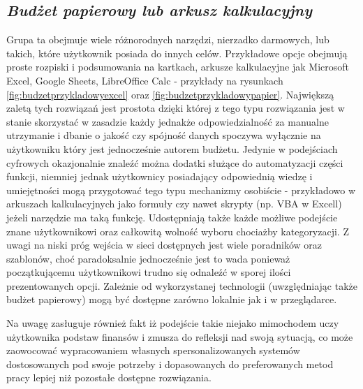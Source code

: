 \documentclass[a4paper,10pt, twoside]{report}
\newcommand{\customstylesection}[1]{\textbf{\textit{#1}}}
\begin{document}
\begin{large}
\section{\customstylesection{Budżet papierowy lub arkusz kalkulacyjny}}
{Grupa ta obejmuje wiele różnorodnych narzędzi, nierzadko darmowych, lub takich, 
które użytkownik posiada do innych celów. Przykładowe opcje obejmują proste 
rozpiski i podsumowania na kartkach, arkusze kalkulacyjne jak Microsoft 
Excel, Google Sheets, LibreOffice Calc - przykłady na rysunkach 
\ref{fig:budzetprzykladowyexcel} oraz \ref{fig:budzetprzykladowypapier}. Największą 
zaletą tych rozwiązań jest prostota dzięki której z tego typu rozwiązania jest 
w stanie skorzystać w zasadzie każdy jednakże odpowiedzialność za manualne 
utrzymanie i dbanie o jakość czy spójność danych spoczywa wyłącznie na 
użytkowniku który jest jednocześnie autorem budżetu. Jedynie w podejściach 
cyfrowych okazjonalnie znaleźć można dodatki służące do automatyzacji części 
funkcji, niemniej jednak użytkownicy posiadający odpowiednią wiedzę i 
umiejętności mogą przygotować tego typu mechanizmy osobiście - przykładowo w 
arkuszach kalkulacyjnych jako formuły czy nawet skrypty (np. VBA w Excell) 
jeżeli narzędzie ma taką funkcję. Udostępniają także każde możliwe podejście 
znane użytkownikowi oraz całkowitą wolność wyboru chociażby kategoryzacji. Z 
uwagi na niski próg wejścia w sieci dostępnych jest wiele poradników oraz 
szablonów, choć paradoksalnie jednocześnie jest to wada ponieważ początkującemu 
użytkownikowi trudno się odnaleźć w sporej ilości prezentowanych opcji. Zależnie
 od wykorzystanej technologii (uwzględniając także budżet papierowy) mogą być 
dostępne zarówno lokalnie jak i w przeglądarce.}

{Na uwagę zasługuje również fakt iż podejście takie niejako mimochodem uczy 
użytkownika podstaw finansów i zmusza do refleksji nad swoją sytuacją, co może 
zaowocować wypracowaniem własnych spersonalizowanych systemów dostosowanych pod 
swoje potrzeby i dopasowanych do preferowanych metod pracy lepiej niż pozostałe 
dostępne rozwiązania.}


\end{large}
\end{document}
